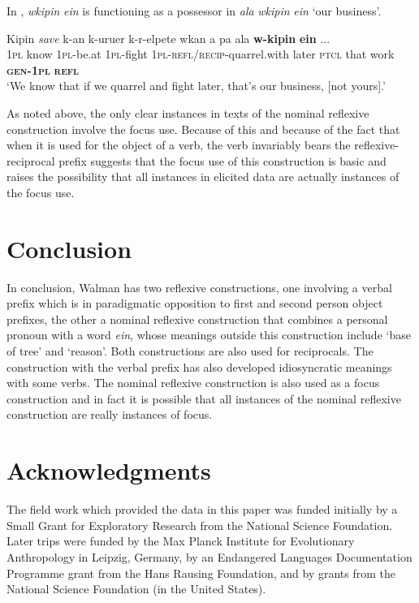\documentclass[output=paper]{langscibook}
\begin{document}
       

In , \emph{wkipin} \emph{ein} is functioning as a possessor in \emph{ala} \emph{wkipin} \emph{ein} ‘our business’.



\ea%
    \label{ex:Brown:67}
    \gll Kipin  \textit{save}  k-an  k-uruer  k-r-elpete  wkan a  pa  ala  \textbf{w-kipin}  \textbf{ein}  ...\\
 \textsc{1pl}  know  \textsc{1pl}{}-be.at  \textsc{1pl}{}-fight  \textsc{1pl}{}-\textsc{refl/recip}{}-quarrel.with  later \textsc{ptcl}  that  work  \textbf{\textsc{gen}}\textbf{{}-}\textbf{\textsc{1pl}}  \textbf{\textsc{refl}}\\
\glt  ‘We know that if we quarrel and fight later, that’s our business, [not yours].’
    \z

  As noted above, the only clear instances in texts of the nominal reflexive construction involve the focus use. Because of this and because of the fact that when it is used for the object of a verb, the verb invariably bears the reflexive-reciprocal prefix suggests that the focus use of this construction is basic and raises the possibility that all instances in elicited data are actually instances of the focus use.



\section{Conclusion}\label{sec:Brown:7} %

  In conclusion, Walman has two reflexive constructions, one involving a verbal prefix which is in paradigmatic opposition to first and second person object prefixes, the other a nominal reflexive construction that combines a personal pronoun with a word \emph{ein}, whose meanings outside this construction include ‘base of tree’ and ‘reason’. Both constructions are also used for reciprocals. The construction with the verbal prefix has also developed idiosyncratic meanings with some verbs. The nominal reflexive construction is also used as a focus construction and in fact it is possible that all instances of the nominal reflexive construction are really instances of focus.

\section*{Acknowledgments}

The field work which provided the data in this paper was funded initially by a Small Grant for Exploratory Research from the National Science Foundation. Later trips were funded by the Max Planck Institute for Evolutionary Anthropology in Leipzig, Germany, by an Endangered Languages Documentation Programme grant from the Hans Rausing Foundation, and by grants from the National Science Foundation (in the United States).

\sloppy\printbibliography[heading=subbibliography,notkeyword=this]
\end{document}
